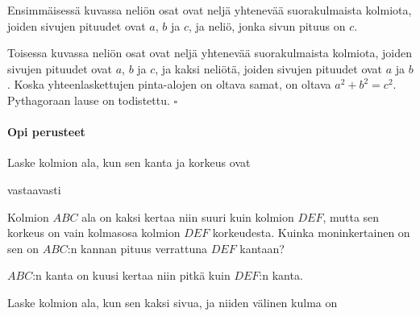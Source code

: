 Ensimmäisessä kuvassa neliön osat ovat neljä yhtenevää suorakulmaista kolmiota, joiden
sivujen pituudet ovat $a$, $b$ ja $c$, ja neliö, jonka sivun pituus on $c$.

Toisessa kuvassa neliön osat ovat neljä yhtenevää suorakulmaista kolmiota, joiden
sivujen pituudet ovat $a$, $b$ ja $c$, ja kaksi neliötä, joiden sivujen pituudet ovat $a$ ja $b$.
Koska yhteenlaskettujen pinta-alojen on oltava samat, on oltava $a^2 + b^2 = c^2$.
Pythagoraan lause on todistettu. $\square $

\begin{tehtavasivu}

\paragraph*{Opi perusteet}

\begin{tehtava}
Laske kolmion ala, kun sen kanta ja korkeus ovat
\begin{alakohdat}
\end{alakohdat}
vastaavasti
\begin{vastaus}
\begin{alakohdat}
\end{alakohdat}
\end{vastaus}
\end{tehtava}

\begin{tehtava}
Kolmion $ABC$ ala on kaksi kertaa niin suuri kuin kolmion $DEF$, mutta sen korkeus on vain kolmasosa kolmion $DEF$ korkeudesta. Kuinka moninkertainen on sen on $ABC$:n kannan pituus verrattuna $DEF$ kantaan?
\begin{vastaus}
$ABC$:n kanta on kuusi kertaa niin pitkä kuin $DEF$:n kanta.
\end{vastaus}
\end{tehtava}


\begin{tehtava}
Laske kolmion ala, kun sen kaksi sivua, ja niiden välinen kulma on
\begin{alakohdat}
\end{alakohdat}
\begin{vastaus}
\begin{alakohdat}
\end{alakohdat}
\end{vastaus}
\end{tehtava}


\end{tehtavasivu}
